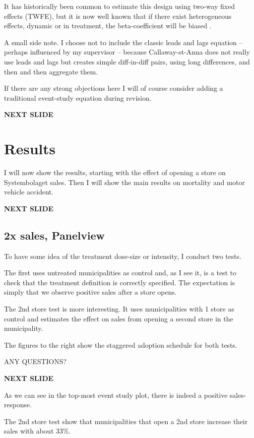 \documentclass[12pt]{article}
\begin{document}
It has historically been common to estimate this design using two-way fixed effects (TWFE), but it is now well known that if there exist heterogeneous effects, dynamic or in treatment, the beta-coefficient will be biased \parencite{roth2023a}.

A small side note. I choose not to include the classic leads and lags equation -- perhaps influenced by my supervisor -- because Callaway-st-Anna does not really use leads and lags but creates simple diff-in-diff pairs, using long differences, and then and then aggregate them. 

If there are any strong objections here I will of course consider adding a traditional event-study equation during revision. 

 \textbf{NEXT SLIDE}

\section{Results}

I will now show the results, starting with the effect of opening a store on Systembolaget sales. Then I will show the main results on mortality and motor vehicle accident.

\textbf{NEXT SLIDE}

\subsection{2x sales, Panelview}
To have some idea of the treatment dose-size or intensity, I conduct two tests.

The first uses untreated municipalities as control and, as I see it, is a test to check that the treatment definition is correctly specified. The expectation is simply that we observe positive sales after a store opens.

The 2nd store test is more interesting. It uses municipalities with 1 store as control and estimates the effect on sales from opening a second store in the municipality.

The figures to the right show the staggered adoption schedule for both tests. 

ANY QUESTIONS?

\textbf{NEXT SLIDE}

As we can see in the top-most event study plot, there is indeed a positive sales-response.

The 2nd store test show that municipalities that open a 2nd store increase their sales with about 33\%. 
\end{document}
